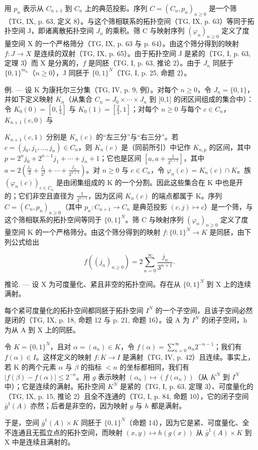 用 \(p_n\) 表示从 \(C_{n+1}\) 到 \(C_n\) 上的典范投影。序列 \(C = (C_n, p_n)_{n \geqslant 0}\) 是一个筛（TG, IX, p. 63, 定义 8）。与这个筛相联系的拓扑空间（TG, IX, p. 63）等同于拓扑空间 J，即诸离散拓扑空间 \(J_n\) 的乘积。筛 C 与映射序列 \((\varphi_n)_{n \geqslant 0}\) 定义了度量空间 X 的一个严格筛分（TG, IX, p. 63 与 p. 64）。由这个筛分得到的映射 \(f: J \to X\) 是连续的双射（TG, IX, p. 65）。由于拓扑空间 J 是紧的（TG, I, p. 63, 定理 3）而 X 是分离的，\(f\) 是同胚（TG, I, p. 63, 推论 2）。由于 \(J_n\) 同胚于 \(\{0, 1\}^{m_n}\)（\(n \geqslant 0\)），J 同胚于 \(\{0, 1\}^N\)（TG, I, p. 25, 命题 2）。

例. --- 设 K 为康托尔三分集（TG, IV, p. 9, 例）。对每个 \(n \geqslant 0\)，令 \(J_{n} = \{0,1\}\)，并如下定义映射 \(K_{n}\)（从集合 \(C_{n} = J_{0} \times \cdots \times J_{n}\) 到 {[}0,1{]} 的闭区间组成的集合中）：令 \(K_{0}(0) = [0, \frac{1}{3}]\) 与 \(K_{0}(1) = [\frac{2}{3}, 1]\)；对每个 \(n \geqslant 0\) 与每个 \(c \in C_{n}\)，\(K_{n+1}(c,0)\) 与

\(K_{n+1}(c,1)\) 分别是 \(K_n(c)\) 的“左三分”与“右三分”。若 \(c = (j_0,j_1,\ldots,j_n) \in C_n\)，则 \(K_n(c)\) 是（同前所引）中记作 \(K_{n,p}\) 的区间，其中 \(p = 2^n j_0 + 2^{n-1}j_1 + \cdots + j_n + 1\)；它也是区间 \([a,a + \frac{1}{3^{n+1}}]\)，其中 \(a = 2(\frac{j_0}{3} + \frac{j_1}{3^2} + \cdots + \frac{j_n}{3^{n+1}})\)。对 \(n \geqslant 0\) 与 \(c \in C_n\)，令 \(\varphi_n(c) = K_n(c) \cap K\)。族 \((\varphi_n(c))_{c \in C_n}\) 是由闭集组成的 K 的一个分割。因此这些集合在 K 中也是开的；它们非空且直径为 \(\frac{1}{3^{n+1}}\)，因为区间 \(K_n(c)\) 的端点都属于 K。序列 \(C = (C_n, p_n)_{n \geqslant 0}\)（其中 \(p_n: C_{n+1} \to C_n\) 是典范投影 \((c,j) \mapsto c\)）是一个筛，与这个筛相联系的拓扑空间等同于 \(\{0,1\}^N\)。筛 C 与映射序列 \((\varphi_n)_{n \geqslant 0}\) 定义了度量空间 K 的一个严格筛分。由这个筛分得到的映射 \(f: \{0,1\}^N \to K\) 是同胚，由下列公式给出

\[
f ((j _ {n}) _ {n \geqslant 0}) = 2 \sum_ {n = 0} ^ {\infty} \frac {j _ {n}}{3 ^ {n + 1}}.
\]

推论. --- 设 X 为可度量化、紧且非空的拓扑空间。存在从 \(\{0,1\}^{N}\) 到 X 上的连续满射。

每个紧可度量化的拓扑空间都同胚于拓扑空间 \(I^{N}\) 的一个子空间，且该子空间必然是闭的（TG, IX, p. 18, 命题 12 与 p. 21, 命题 16）。设 A 为 \(I^{N}\) 的闭子空间，h 为从 A 到 X 上的同胚。

令 \(K = \{0,1\}^{N}\)，且对 \(\alpha = (a_n) \in K\)，令 \(f(\alpha) = \sum_{n=0}^{\infty} a_n 2^{-n-1}\)；我们有 \(f(\alpha) \in I\)。这样定义的映射 \(f: K \to I\) 是满射（TG, IV, p. 42）且连续。事实上，若 K 的两个元素 \(\alpha\) 与 \(\beta\) 的指标 \(< n\) 的坐标都相同，我们有 \(|f(\beta) - f(\alpha)| \leqslant 2^{-n}\)。用 \(g\) 表示映射 \((\alpha_n) \mapsto (f(\alpha_n))\)（从 \(K^N\) 到 \(I^N\) 中）；它是连续的满射。拓扑空间 \(K^N\) 是紧的（TG, I, p. 63, 定理 3）、可度量化的（TG, IX, p. 15, 推论 2）且全不连通的（TG, I, p. 84, 命题 10），它的闭子空间 \(\bar{g}^{1}(A)\) 亦然；后者是非空的，因为映射 \(g\) 与 \(h\) 都是满射。

于是，空间 \(\bar{g}^{1}(A) \times K\) 同胚于 \(\{0,1\}^{N}\)（命题 14），因为它是紧、可度量化、全不连通且无孤立点的拓扑空间，而映射 \((x,y) \mapsto h(g(x))\) 从 \(\bar{g}^{1}(A) \times K\) 到 X 中是连续且满射的。

